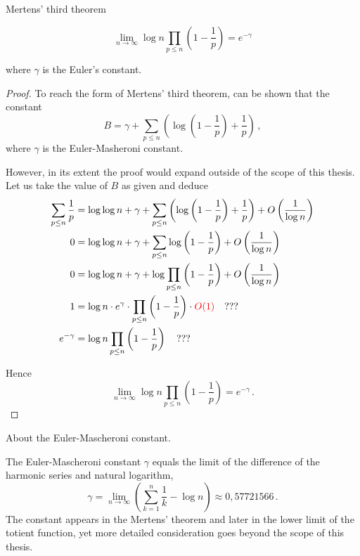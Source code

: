 \documentclass{article}
\begin{document}
\begin{theorem}
Mertens' third theorem \cite{HW:mertens}
\label{thm:mertens3}

\begin{equation*}
    \lim_{n \rightarrow \infty} \log n \prod_{p\leq n} \left(1-\frac{1}{p}\right) = e^{-\gamma}
\end{equation*}

where $\gamma$ is the Euler's constant.

\begin{proof}
To reach the form of Mertens' third theorem, can be shown \cite{HW:mertens} that the constant
\begin{equation*}
    B = \gamma + \sum_{p\leq n} \left(\log \left(1-\frac{1}{p}\right)+\frac{1}{p}\right)\,,
\end{equation*}
where $\gamma$ is the Euler-Masheroni constant.

However, in its extent the proof would expand outside of the scope of this thesis. Let us take the value of $B$ as given and deduce
\begin{align*}
\sum_{p\leq n} \frac{1}{p} & = \log\log n + \gamma + \sum_{p\leq n} \left(\log \left(1-\frac{1}{p}\right)+\frac{1}{p}\right) + O\left(\frac{1}{\log n}\right)\\
0 & = \log\log n + \gamma + \sum_{p\leq n} \log \left(1-\frac{1}{p}\right) + O\left(\frac{1}{\log n}\right)\\
0 & = \log\log n + \gamma + \log \prod_{p\leq n} \left(1-\frac{1}{p}\right) + O\left(\frac{1}{\log n}\right)\\
1 & = \log n \cdot e^\gamma \cdot \prod_{p\leq n} \left(1-\frac{1}{p}\right) \cdot \textcolor{red}{O(1)} \quad \text{???}\\
e^{-\gamma} & = \log n \prod_{p\le n} \left(1-\frac{1}{p}\right) \quad \text{???}
\end{align*}

Hence
\begin{equation*}
    \lim_{n \rightarrow \infty} \log n \prod_{p\leq n} \left(1-\frac{1}{p}\right) = e^{-\gamma}\,.
\end{equation*}
\end{proof}

\end{theorem}

\begin{remark}
About the Euler-Mascheroni constant. \cite{gamma}

The Euler-Mascheroni constant $\gamma$ equals the limit of the difference of the harmonic series and natural logarithm,
\begin{equation*}
    \gamma=\lim_{n\rightarrow\infty} \left(\sum_{k=1}^n \frac{1}{k} - \log n\right) \approx 0,57721566\,.
\end{equation*}
The constant appears in the Mertens' theorem and later in the lower limit of the totient function, yet more detailed consideration goes beyond the scope of this thesis.

\end{remark}
\end{document}
